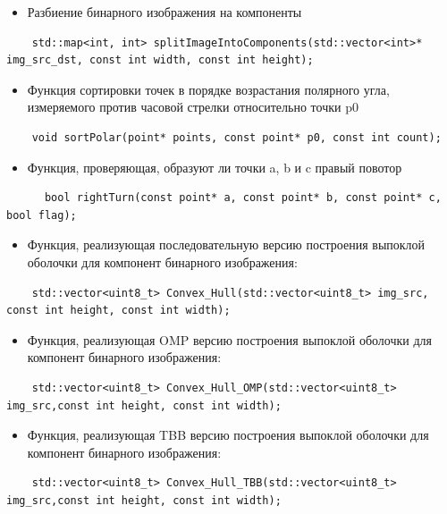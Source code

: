 \documentclass{report}
\begin{document}
\begin{itemize}
\item Разбиение бинарного изображения на компоненты
\end{itemize}
\begin{lstlisting}
	std::map<int, int> splitImageIntoComponents(std::vector<int>* img_src_dst, const int width, const int height);
\end{lstlisting}
\begin{itemize}
\item Функция сортировки точек в порядке возрастания полярного угла, измеряемого против часовой стрелки относительно точки p0 
\end{itemize}
\begin{lstlisting}
	void sortPolar(point* points, const point* p0, const int count);
\end{lstlisting}
\begin{itemize}
\item Функция, проверяющая, образуют ли точки a, b и c правый повотор
\end{itemize}
\begin{lstlisting}
	  bool rightTurn(const point* a, const point* b, const point* c, bool flag);
\end{lstlisting}
\begin{itemize}
\item Функция, реализующая последовательную версию построения выпоклой оболочки для компонент бинарного изображения: 
\end{itemize}
\begin{lstlisting}
	std::vector<uint8_t> Convex_Hull(std::vector<uint8_t> img_src, const int height, const int width);
\end{lstlisting}
\begin{itemize}
\item Функция, реализующая OMP версию построения выпоклой оболочки для компонент бинарного изображения: 
\end{itemize}
\begin{lstlisting}
	std::vector<uint8_t> Convex_Hull_OMP(std::vector<uint8_t> img_src,const int height, const int width);
\end{lstlisting}
\begin{itemize}
\item Функция, реализующая TBB версию построения выпоклой оболочки для компонент бинарного изображения: 
\end{itemize}
\begin{lstlisting}
	std::vector<uint8_t> Convex_Hull_TBB(std::vector<uint8_t> img_src,const int height, const int width);
\end{lstlisting}
\newpage
\end{document}
